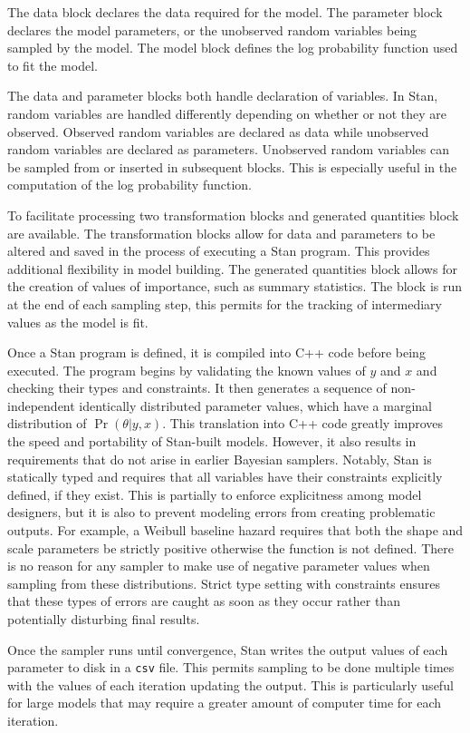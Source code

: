 The data block declares the data required for the model. The parameter block declares the model parameters, or the unobserved random variables being sampled by the model. The model block defines the log probability function used to fit the model. 

The data and parameter blocks both handle declaration of variables. In Stan, random variables are handled differently depending on whether or not they are observed. Observed random variables are declared as data while unobserved random variables are declared as parameters. Unobserved random variables can be sampled from or inserted in subsequent blocks. This is especially useful in the computation of the log probability function. 

To facilitate processing two transformation blocks and generated quantities block are available. The transformation blocks allow for data and parameters to be altered and saved in the process of executing a Stan program. This provides additional flexibility in model building. The generated quantities block allows for the creation of values of importance, such as summary statistics. The block is run at the end of each sampling step, this permits for the tracking of intermediary values as the model is fit. 

Once a Stan program is defined, it is compiled into C++ code before being executed. The program begins by validating the known values of $y$ and $x$ and checking their types and constraints. It then generates a sequence of non-independent identically distributed parameter values, which have a marginal distribution of $\Pr(\theta|y,x)$. This translation into C++ code greatly improves the speed and portability of Stan-built models. However, it also results in requirements that do not arise in earlier Bayesian samplers. Notably, Stan is statically typed and requires that all variables have their constraints explicitly defined, if they exist. This is partially to enforce explicitness among model designers, but it is also to prevent modeling errors from creating problematic outputs. For example, a Weibull baseline hazard requires that both the shape and scale parameters be strictly positive otherwise the function is not defined. There is no reason for any sampler to make use of negative parameter values when sampling from these distributions. Strict type setting with constraints ensures that these types of errors are caught as soon as they occur rather than potentially disturbing final results. 

Once the sampler runs until convergence, Stan writes the output values of each parameter to disk in a \lstinline{csv} file. This permits sampling to be done multiple times with the values of each iteration updating the output. This is particularly useful for large models that may require a greater amount of computer time for each iteration.


